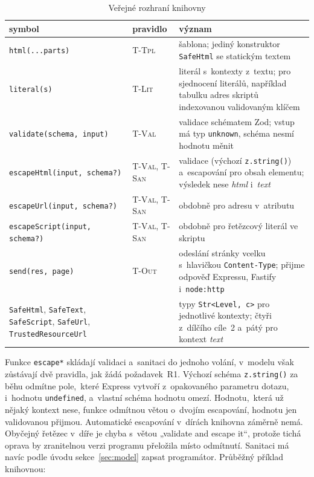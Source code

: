 \begin{table}[htbp]
    \centering
    \footnotesize
    \begin{tabularx}{\textwidth}{@{}>{\raggedright\arraybackslash}p{3.8cm}>{\raggedright\arraybackslash}p{2.1cm}Y@{}}
        \toprule
        \textbf{symbol} & \textbf{pravidlo} & \textbf{význam} \\
        \midrule
        \texttt{html(...parts)} & \textsc{T-Tpl} & šablona; jediný konstruktor \texttt{SafeHtml} se statickým textem \\
        \texttt{literal(s)} & \textsc{T-Lit} & literál s~kontexty z~textu; pro sjednocení literálů, například tabulku adres skriptů indexovanou validovaným klíčem \\
        \texttt{validate(schema, input)} & \textsc{T-Val} & validace schématem Zod; vstup má typ \texttt{unknown}, schéma nesmí hodnotu měnit \\
        \texttt{escapeHtml(input, schema?)} & \textsc{T-Val}, \textsc{T-San} & validace (výchozí \texttt{z.string()}) a~escapování pro obsah elementu; výsledek nese \emph{html} i~\emph{text} \\
        \texttt{escapeUrl(input, schema?)} & \textsc{T-Val}, \textsc{T-San} & obdobně pro adresu v~atributu \\
        \texttt{escapeScript(input, schema?)} & \textsc{T-Val}, \textsc{T-San} & obdobně pro řetězcový literál ve skriptu \\
        \texttt{send(res, page)} & \textsc{T-Out} & odeslání stránky vcelku s~hlavičkou \texttt{Content-Type}; přijme odpověď Expressu, Fastify i~\texttt{node:http} \\
        \texttt{SafeHtml}, \texttt{SafeText}, \texttt{SafeScript}, \texttt{SafeUrl}, \texttt{TrustedResourceUrl} & & typy \texttt{Str<Level, c>} pro jednotlivé kontexty; čtyři z~dílčího cíle~2 a~pátý pro kontext \emph{text} \\
        \bottomrule
    \end{tabularx}
    \caption{Veřejné rozhraní knihovny}
    \label{tab:lib}
\end{table}

Funkce \texttt{escape*} skládají validaci a~sanitaci do jednoho volání, v~modelu však zůstávají dvě pravidla, jak žádá požadavek~R1. Výchozí schéma \texttt{z.string()} za běhu odmítne pole,~které Express vytvoří z~opakovaného parametru dotazu, i~hodnotu \texttt{undefined}, a~vlastní schéma hodnotu omezí. Hodnotu,~která už nějaký kontext nese, funkce odmítnou větou o~dvojím escapování, hodnotu jen validovanou přijmou. Automatické escapování v~dírách knihovna záměrně nemá. Obyčejný řetězec v~díře je chyba s~větou „validate and escape it“, protože tichá oprava by zranitelnou verzi programu přeložila místo odmítnutí. Sanitaci má navíc podle úvodu sekce~\ref{sec:model} zapsat programátor. Průběžný příklad knihovnou:

